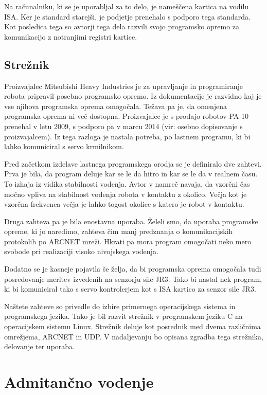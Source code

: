 \documentclass[a4paper]{article}
\begin{document}
Na računalniku, ki se je uporabljal za to delo, je nameščena kartica na vodilu ISA. Ker je standard starejši, je podjetje prenehalo s podporo tega standarda. Kot posledica tega so avtorji tega dela razvili svojo programsko opremo za komunikacijo z notranjimi registri kartice.

\subsection{Strežnik} \label{sec:streznik}

Proizvajalec Mitsubishi Heavy Industries je za upravljanje in programiranje robota pripravil posebno programsko opremo. Iz dokumentacije je razvidno kaj je vse njihova programska oprema omogočala. Težava pa je, da omenjena programska oprema ni več dostopna. Proizvajalec je s prodajo robotov PA-10 prenehal v letu 2009, s podporo pa v marcu 2014 (vir: osebno dopisovanje s proizvajalcem). Iz tega razloga je nastala potreba, po lastnem programu, ki bi lahko komuniciral s servo krmilnikom.

Pred začetkom izdelave lastnega programskega orodja se je definiralo dve zahtevi. Prva je bila, da program deluje kar se le da hitro in kar se le da v realnem času. To izhaja iz vidika stabilnosti vodenja. Avtor v \cite{mihelj_hapt} namreč navaja, da vzorčni čas močno vpliva na stabilnost vodenja robota v kontaktu z okolico. Večja kot je vzorčna frekvenca večja je lahko togost okolice s katero je robot v kontaktu.

Druga zahteva pa je bila enostavna uporaba. Želeli smo, da uporaba programske opreme, ki jo naredimo, zahteva čim manj predznanja o komunikacijskih protokolih po ARCNET mreži. Hkrati pa mora program omogočati neko mero svobode pri realizaciji visoko nivojskega vodenja.

Dodatno se je kasneje pojavila še želja, da bi programska oprema omogočala tudi posredovanje meritev izvedenih na senzorju sile JR3. Tako bi nastal nek program, ki bi komuniciral tako s servo kontrolerjem kot s ISA kartico za senzor sile JR3.

Naštete zahteve so privedle do izbire primernega operacijskega sistema in programskega jezika. Tako je bil razvit strežnik v programskem jeziku C na operacijskem sistemu Linux. Strežnik deluje kot posrednik med dvema različnima omrežjema, ARCNET in UDP.  V nadaljevanju bo opisana zgradba tega strežnika, delovanje ter uporaba.

\section{Admitančno vodenje}
\end{document}
